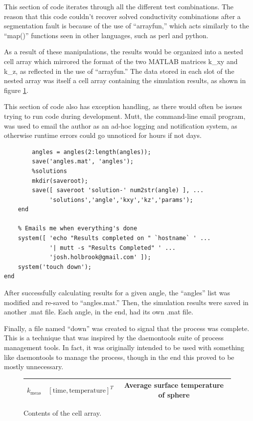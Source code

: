 This section of code iterates through all the different test combinations. The
reason that this code couldn't recover solved conductivity combinations after
a segmentation fault is because of the use of ``arrayfun,'' which acts similarly
to the ``map()'' functions seen in other languages, such as perl and python.

As a result of these manipulations, the results would be organized into a nested
cell array which mirrored the format of the two MATLAB matrices k\_xy and k\_z,
as reflected in the use of ``arrayfun.'' The data stored in each slot of the
nested array was itself a cell array containing the simulation results, as shown
in figure \ref{fig:cellarray}.

This section of code also has exception handling, as there would often be issues
trying to run code during development. Mutt, the command-line email program, was
used to email the author as an ad-hoc logging and notification system, as
otherwise runtime errors could go unnoticed for hours if not days.

\small
\begin{verbatim}
        angles = angles(2:length(angles));
        save('angles.mat', 'angles');
        %solutions
        mkdir(saveroot);
        save([ saveroot 'solution-' num2str(angle) ], ...
             'solutions','angle','kxy','kz','params');
    end

    % Emails me when everything's done
    system([ 'echo "Results completed on " `hostname` ' ...
             '| mutt -s "Results Completed" ' ...
             'josh.holbrook@gmail.com' ]);
    system('touch down');
end
\end{verbatim}
\normalsize

After successfully calculating results for a given angle, the ``angles'' list
was modified and re-saved to ``angles.mat.'' Then, the simulation results were
saved in another .mat file. Each angle, in the end, had its own .mat file. 

Finally, a file named ``down'' was created to signal that the process was
complete. This is a technique that was inspired by the daemontools suite of
process management tools. In fact, it was originally intended to be used with
something like daemontools to manage the process, though in the end this proved
to be mostly unnecessary.


\begin{figure}
\label{fig:cellarray}

\centering
\begin{tabular}{| c | c | c |}
\hline
\(k_\textrm{meas}\) & \( \left[ \textrm{time}, \textrm{temperature} \right]^T\) & Average surface temperature of sphere\\
\hline
\end{tabular}
\caption{Contents of the cell array.}
\end{figure}

